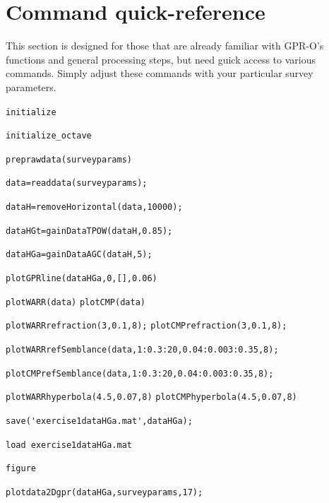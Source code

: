 \documentclass[11pt]{article}
\begin{document}
\section{Command quick-reference}

This section is designed for those that are already familiar with GPR-O's
functions and general processing steps, but need guick access to
various commands. Simply adjust these commands with your particular
survey parameters.

\qquad \verb#initialize#
	
\qquad \verb#initialize_octave#

\qquad \verb#preprawdata(surveyparams)#

\qquad \verb#data=readdata(surveyparams);#

\qquad \verb#dataH=removeHorizontal(data,10000);#

\qquad \verb#dataHGt=gainDataTPOW(dataH,0.85);#

\qquad \verb#dataHGa=gainDataAGC(dataH,5);#

\qquad \verb#plotGPRline(dataHGa,0,[],0.06)#

\qquad \verb#plotWARR(data)#						\qquad \verb#plotCMP(data)#

\qquad \verb#plotWARRrefraction(3,0.1,8);#			\qquad \verb#plotCMPrefraction(3,0.1,8);#

\qquad \verb#plotWARRrefSemblance(data,1:0.3:20,0.04:0.003:0.35,8);#

\qquad \verb#plotCMPrefSemblance(data,1:0.3:20,0.04:0.003:0.35,8);#

\qquad \verb#plotWARRhyperbola(4.5,0.07,8)#			\qquad \verb#plotCMPhyperbola(4.5,0.07,8)#

\qquad \verb#save('exercise1dataHGa.mat',dataHGa);#

\qquad \verb#load exercise1dataHGa.mat#

\qquad \verb#figure#

\qquad \verb#plotdata2Dgpr(dataHGa,surveyparams,17);#
\end{document}
